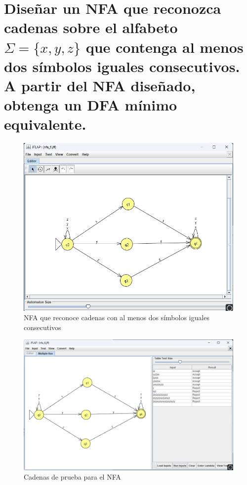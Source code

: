 \documentclass[11pt]{report}
\begin{document}
\section{Diseñar un NFA que reconozca cadenas sobre el alfabeto $\Sigma = \{x, y, z\}$ que contenga al menos dos símbolos iguales consecutivos. A partir del NFA diseñado, obtenga un DFA mínimo equivalente.}
\begin{figure}[H]
  \centering
  \includegraphics[scale=0.55]{img/NFA_06.png}
  \caption{NFA que reconoce cadenas con al menos dos símbolos iguales consecutivos}
\end{figure}

\begin{figure}[H]
  \centering
  \includegraphics[scale=0.5]{img/NFA_06_test.png}
  \caption{Cadenas de prueba para el NFA}
\end{figure}
\end{document}
